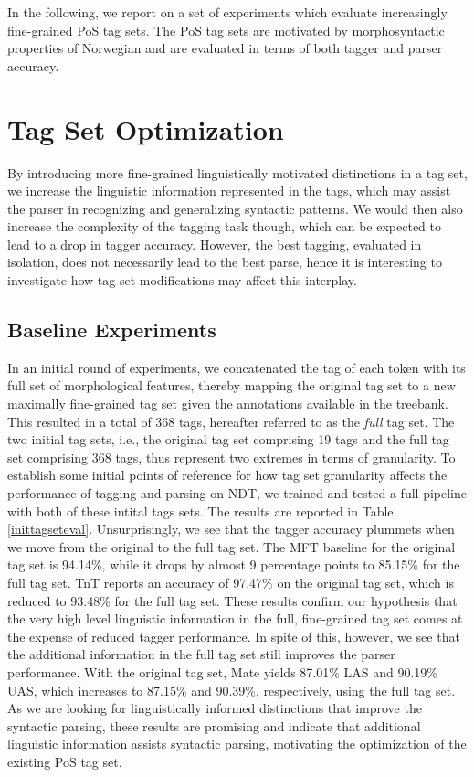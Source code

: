\documentclass[11pt,a4paper]{article}
\begin{document}
In the following, we report on a set of experiments which evaluate increasingly
fine-grained PoS tag sets. The PoS tag sets are motivated by morphosyntactic
properties of Norwegian and are evaluated in terms of both tagger and parser
accuracy.

\section{Tag Set Optimization}
\label{sec:optimization}
By introducing more fine-grained linguistically motivated distinctions in a tag
set, we increase the linguistic information represented in the tags, which may
assist the parser in recognizing and generalizing syntactic patterns.
We would then also increase the complexity of the tagging task though,
which can be expected to lead to a drop in tagger accuracy.
However, the best tagging, evaluated in isolation, does not necessarily lead to the
best parse, hence it is interesting to investigate how tag set modifications
may affect this interplay.


\subsection{Baseline Experiments}
In an initial round of experiments, we concatenated the tag of each token with
its full set of morphological features, thereby mapping the original tag set to a
new maximally fine-grained tag set given the annotations available in the
treebank. This resulted in a total of 368 tags,
hereafter referred to as the \emph{full} tag set.
The two initial tag sets, i.e., the original tag set comprising 19 tags and the
full tag set comprising 368 tags, thus represent two extremes in terms of
granularity.
To establish some initial points of reference for how tag set granularity affects the
performance of tagging and parsing on NDT, we trained and tested a full pipeline with both of
these intital tags sets. The results are reported in Table \ref{inittagseteval}.
Unsurprisingly, we see that the tagger accuracy
plummets when we move from the original to the full tag set. The MFT
baseline for the original tag set is 94.14\%, while it drops by almost 9
percentage points to 85.15\% for the full tag set. TnT reports an accuracy of
97.47\% on the original tag set, which is reduced to 93.48\% for the full tag
set. These results confirm our hypothesis that the very high level linguistic
information
in the full, fine-grained tag set comes at the expense of reduced tagger
performance.  In spite of this, however, we see that the additional information
in the full tag set still improves the parser performance. With the original tag set, Mate
yields 87.01\% LAS and 90.19\% UAS, which increases to 87.15\% and
90.39\%, respectively, using the full tag set. As we are looking for
linguistically informed distinctions that improve the syntactic parsing, these
results are promising and indicate that additional linguistic
information assists syntactic parsing, motivating the optimization of the
existing PoS tag set.
\end{document}
